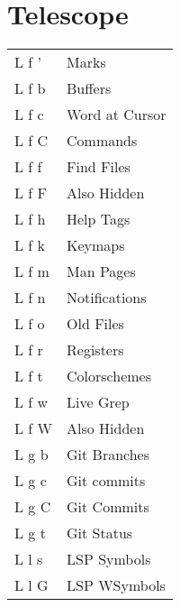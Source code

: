 \documentclass[
  ,landscape
  ,columns=4
]{cheatsheet}
\begin{document}
\section{Telescope}

\begin{tabular}{ll}
	L f ' & Marks          \\
	L f b & Buffers        \\
	L f c & Word at Cursor \\
	L f C & Commands       \\
	L f f & Find Files     \\
	L f F & Also Hidden    \\
	L f h & Help Tags      \\
	L f k & Keymaps        \\
	L f m & Man Pages      \\
	L f n & Notifications  \\
	L f o & Old Files      \\
	L f r & Registers      \\
	L f t & Colorschemes   \\
	L f w & Live Grep      \\
	L f W & Also Hidden    \\
	L g b & Git Branches   \\
	L g c & Git commits    \\
	L g C & Git Commits    \\
	L g t & Git Status     \\
	L l s & LSP Symbols    \\
	L l G & LSP WSymbols   \\
\end{tabular}
\end{document}
